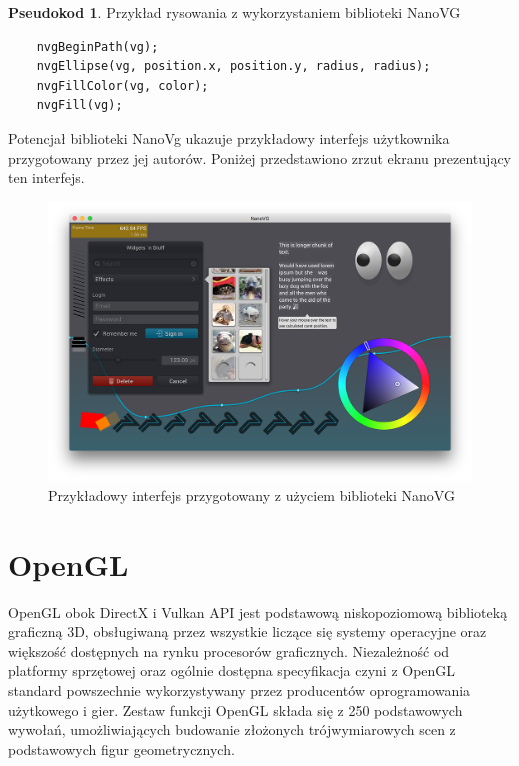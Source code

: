 \documentclass[a4paper,11pt,twoside]{report}
\theoremstyle{definition}
\newtheorem{pseudokod}{Pseudokod}[subsection]
\begin{document}
\begin{pseudokod}
Przykład rysowania z wykorzystaniem biblioteki NanoVG
\begin{verbatim}
    nvgBeginPath(vg);
    nvgEllipse(vg, position.x, position.y, radius, radius);
    nvgFillColor(vg, color);
    nvgFill(vg);
\end{verbatim}
\end{pseudokod}

Potencjał biblioteki NanoVg ukazuje przykładowy interfejs użytkownika przygotowany przez jej autorów. Poniżej przedstawiono zrzut ekranu prezentujący ten interfejs.

\begin{figure}[h!]
\centering
\includegraphics[scale=0.8]{NanoVGInterface}
\caption[Przykładowy interfejs przygotowany z użyciem biblioteki NanoVG]{Przykładowy interfejs przygotowany z użyciem biblioteki NanoVG}
\end{figure}

\section{OpenGL}

OpenGL obok DirectX i Vulkan API jest podstawową niskopoziomową biblioteką graficzną 3D, obsługiwaną przez wszystkie liczące się systemy operacyjne oraz większość dostępnych na rynku procesorów graficznych. Niezależność od platformy sprzętowej oraz ogólnie dostępna specyfikacja czyni z OpenGL standard powszechnie wykorzystywany przez producentów oprogramowania użytkowego i gier. Zestaw funkcji OpenGL składa się z 250 podstawowych wywołań, umożliwiających budowanie złożonych trójwymiarowych scen z podstawowych figur geometrycznych.
\end{document}
